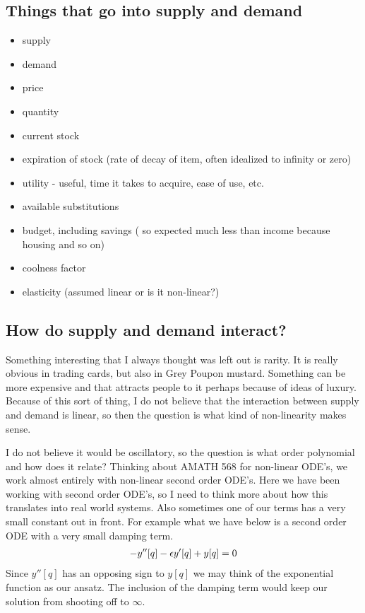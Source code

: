 \documentclass{article}
\begin{document}
\subsection{Things that go into supply and demand}
\begin{itemize}
	\item supply
	\item demand
	\item price
	\item quantity
	\item current stock
	\item expiration of stock (rate of decay of item, often idealized to infinity or zero)
	\item utility - useful, time it takes to acquire, ease of use, etc.
	\item available substitutions
	\item budget, including savings ( so expected much less than income because housing and so on)
	\item coolness factor
	\item elasticity (assumed linear or is it non-linear?)
\end{itemize}

\subsection{How do supply and demand interact?}
Something interesting that I always thought was left out is rarity. It is really obvious in trading cards, but also in Grey Poupon mustard. Something can be more expensive and that attracts people to it perhaps because of ideas of luxury. Because of this sort of thing, I do not believe that the interaction between supply and demand is linear, so then the question is what kind of non-linearity makes sense. 

I do not believe it would be oscillatory, so the question is what order polynomial and how does it relate? 
Thinking about AMATH 568 for non-linear ODE's, we work almost entirely with non-linear second order ODE's. Here we have been working with second order ODE's, so I need to think more about how this translates into real world systems. Also sometimes one of our terms has a very small constant out in front. For example what we have below is a second order ODE with a very small damping term. 
\begin{align*}
	-y''[q] - \epsilon y'[q] +y[q] = 0
\end{align*}
Since $y''[q]$ has an opposing sign to $y[q]$ we may think of the exponential function as our ansatz. The inclusion of the damping term would keep our solution from shooting off to $\infty$. 
\end{document}
